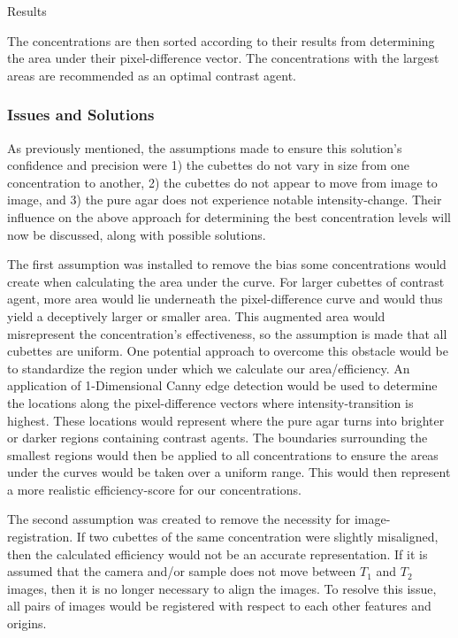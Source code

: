 \documentclass[a4paper,12pt]{article}
\begin{document}
\begin{section}{Results}
\doublespacing

The concentrations are then sorted according to their results from determining the area under their pixel-difference vector. The concentrations with the largest areas are recommended as an optimal contrast agent.

\subsubsection{Issues and Solutions}

As previously mentioned, the assumptions made to ensure this solution's confidence and precision were 1) the cubettes do not vary in size from one concentration to another, 2) the cubettes do not appear to move from image to image, and 3) the pure agar does not experience notable intensity-change. Their influence on the above approach for determining the best concentration levels will now be discussed, along with possible solutions.

The first assumption was installed to remove the bias some concentrations would create when calculating the area under the curve. For larger cubettes of contrast agent, more area would lie underneath the pixel-difference curve and would thus yield a deceptively larger or smaller area. This augmented area would misrepresent the concentration's effectiveness, so the assumption is made that all cubettes are uniform. One potential approach to overcome this obstacle would be to standardize the region under which we calculate our area/efficiency. An application of 1-Dimensional Canny edge detection would be used to determine the locations along the pixel-difference vectors where intensity-transition is highest. These locations would represent where the pure agar turns into brighter or darker regions containing contrast agents. The boundaries surrounding the smallest regions would then be applied to all concentrations to ensure the areas under the curves would be taken over a uniform range. This would then represent a more realistic efficiency-score for our concentrations.

The second assumption was created to remove the necessity for image-registration. If two cubettes of the same concentration were slightly misaligned, then the calculated efficiency would not be an accurate representation. If it is assumed that the camera and/or sample does not move between $T_1$ and $T_2$ images, then it is no longer necessary to align the images. To resolve this issue, all pairs of images would be registered with respect to each other features and origins.


\end{section}
\end{document}
